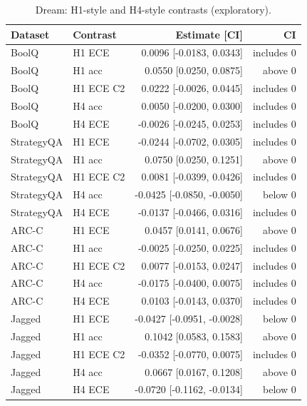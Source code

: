\begin{table}[h!]
\centering
\scriptsize
\caption{Dream: H1-style and H4-style contrasts (exploratory).}
\label{tab:dream_contrasts}
\begin{tabular}{llrr}
\toprule
Dataset & Contrast & Estimate [CI] & CI \\
\midrule
BoolQ & H1 ECE & 0.0096 [-0.0183, 0.0343] & includes 0 \\
BoolQ & H1 acc & 0.0550 [0.0250, 0.0875] & above 0 \\
BoolQ & H1 ECE C2 & 0.0222 [-0.0026, 0.0445] & includes 0 \\
BoolQ & H4 acc & 0.0050 [-0.0200, 0.0300] & includes 0 \\
BoolQ & H4 ECE & -0.0026 [-0.0245, 0.0253] & includes 0 \\
StrategyQA & H1 ECE & -0.0244 [-0.0702, 0.0305] & includes 0 \\
StrategyQA & H1 acc & 0.0750 [0.0250, 0.1251] & above 0 \\
StrategyQA & H1 ECE C2 & 0.0081 [-0.0399, 0.0426] & includes 0 \\
StrategyQA & H4 acc & -0.0425 [-0.0850, -0.0050] & below 0 \\
StrategyQA & H4 ECE & -0.0137 [-0.0466, 0.0316] & includes 0 \\
ARC-C & H1 ECE & 0.0457 [0.0141, 0.0676] & above 0 \\
ARC-C & H1 acc & -0.0025 [-0.0250, 0.0225] & includes 0 \\
ARC-C & H1 ECE C2 & 0.0077 [-0.0153, 0.0247] & includes 0 \\
ARC-C & H4 acc & -0.0175 [-0.0400, 0.0075] & includes 0 \\
ARC-C & H4 ECE & 0.0103 [-0.0143, 0.0370] & includes 0 \\
Jagged & H1 ECE & -0.0427 [-0.0951, -0.0028] & below 0 \\
Jagged & H1 acc & 0.1042 [0.0583, 0.1583] & above 0 \\
Jagged & H1 ECE C2 & -0.0352 [-0.0770, 0.0075] & includes 0 \\
Jagged & H4 acc & 0.0667 [0.0167, 0.1208] & above 0 \\
Jagged & H4 ECE & -0.0720 [-0.1162, -0.0134] & below 0 \\
\bottomrule
\end{tabular}
\end{table}
